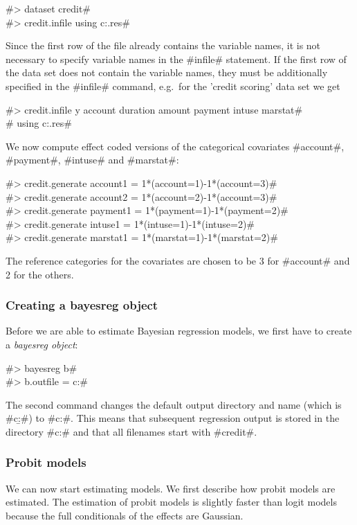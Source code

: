 #> dataset credit# \\
#> credit.infile using c:\bayes\examples\credit.res#

Since the first row of the file already contains the variable
names, it is not necessary to specify variable names in the
#infile# statement. If the first row of the data set does not
contain the variable names, they must be additionally specified in
the #infile# command, e.g.~for the 'credit scoring' data set we
get

#> credit.infile y account duration amount payment intuse marstat# \\
#  using c:\bayes\examples\credit.res#


We now compute effect coded versions of the categorical covariates
#account#, #payment#, #intuse# and #marstat#:

#> credit.generate account1  = 1*(account=1)-1*(account=3)# \\
#> credit.generate account2  = 1*(account=2)-1*(account=3)# \\
#> credit.generate payment1 = 1*(payment=1)-1*(payment=2)# \\
#> credit.generate intuse1 = 1*(intuse=1)-1*(intuse=2)# \\
#> credit.generate marstat1 = 1*(marstat=1)-1*(marstat=2)#

The reference categories for the covariates are chosen to be 3 for
#account# and 2 for the others.

\subsubsection{Creating a bayesreg object}

Before we are able to estimate Bayesian regression models, we
first have to create a {\em bayesreg object}:

#> bayesreg b# \\
#> b.outfile = c:\results\credit#

The second command changes the default output directory and name
(which is #c:\bayes\output\b#) to
#c:\results\credit#. This means that
subsequent regression output is stored in the directory
#c:\results# and that all filenames start with
#credit#.

\subsubsection{Probit models}

\label{credit_probit} We can now start estimating models. We first
describe how probit models are estimated. The estimation of probit
models is slightly faster than logit models because the full
conditionals of the effects are Gaussian.

